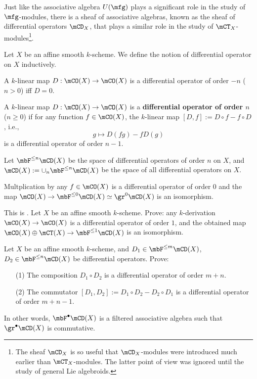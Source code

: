 	Just like the associative algebra $U(\mfg)$ plays a significant role in the study of $\mfg$-modules, there is a sheaf of associative algebras, known as the sheaf of differential operators $\mCD_X$, that plays a similar role in the study of $\mCT_X$-modules\footnote{The sheaf $\mCD_X$ is so useful that $\mCD_X$-modules were introduced much earlier than $\mCT_X$-modules. The latter point of view was ignored until the study of general Lie algebroids.}.

	\begin{defn}
		\label{defn-diff}
		Let $X$ be an affine smooth $k$-scheme. We define the notion of differential operator on $X$ inductively. 

		A $k$-linear map $D: \mCO(X) \to \mCO(X)$ is a differential operator of order $-n$ ($n>0$) iff $D=0$.

		A $k$-linear map $D: \mCO(X) \to \mCO(X)$ is a \textbf{differential operator of order $n$} ($n\ge 0$) if for any function $f\in \mCO(X)$, the $k$-linear map $[D,f]:=D\circ f- f\circ D$, i.e.,
		\[
			g \mapsto D(fg) - fD(g)
		\]
		is a differential operator of order $n-1$. 

		Let $\mbF^{\le n}\mCD(X)$ be the space of differential operators of order $n$ on $X$, and $\mCD(X):= \cup_n \mbF^{\le n}\mCD(X)$ be the space of all differential operators on $X$.
	\end{defn}

	\begin{exam}
		Multplication by any $f\in \mCO(X)$ is a differential operator of order $0$ and the map $\mCO(X) \to \mbF^{\le 0}\mCD(X) \simeq \gr^0 \mCD(X)$ is an isomorphism.
	\end{exam}

	\begin{exe}
		\label{exe-diff-2}
		This is . Let $X$ be an affine smooth $k$-scheme. Prove: any $k$-derivation $\mCO(X) \to \mCO(X)$ is a differential operator of order $1$, and the obtained map $\mCO(X) \oplus \mCT(X) \to \mbF^{\le 1} \mCD(X)$ is an isomorphism.
	\end{exe}



	\begin{lem}
		Let $X$ be an affine smooth $k$-scheme, and $D_1\in \mbF^{\le m}\mCD(X)$, $D_2\in \mbF^{\le n}\mCD(X)$ be differential operators. Prove:
		\begin{itemize}
			\item[(1)]
				The composition $D_1\circ D_2$ is a differential operator of order $m+n$.
			\item[(2)]
				The commutator $[D_1,D_2]:=D_1\circ D_2 - D_2 \circ D_1$ is a differential operator of order $m+n-1$.		
		\end{itemize}
		In other words, $\mbF^\bullet\mCD(X)$ is a filtered associative algebra such that $\gr^\bullet \mCD(X)$ is commutative.
	\end{lem}

